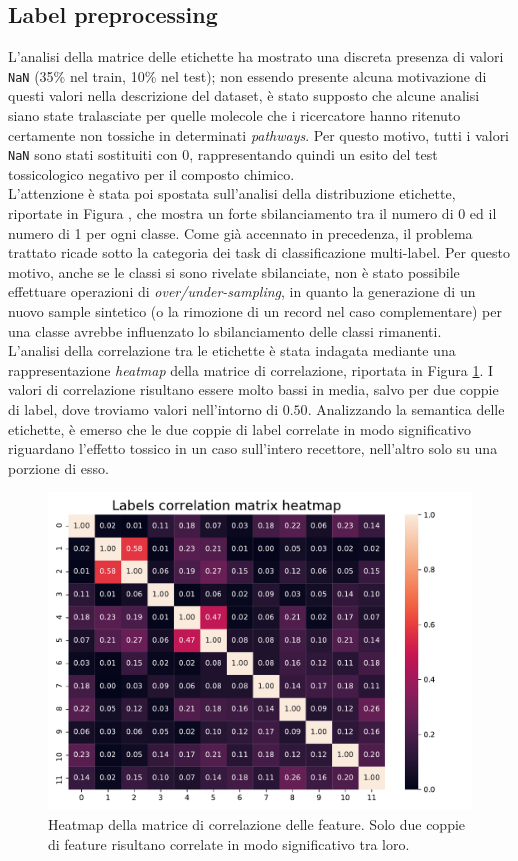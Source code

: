 \subsection{Label preprocessing}
L'analisi della matrice delle etichette ha mostrato una discreta presenza di valori \texttt{NaN} (35\% nel train, 10\% nel test); non essendo presente alcuna motivazione di questi valori nella descrizione del dataset, è stato supposto che alcune analisi siano state tralasciate per quelle molecole che i ricercatore hanno ritenuto certamente non tossiche in determinati \textit{pathways}. Per questo motivo, tutti i valori \texttt{NaN} sono stati sostituiti con $0$, rappresentando quindi un esito del test tossicologico negativo per il composto chimico. \\
L'attenzione è stata poi spostata sull'analisi della distribuzione etichette, riportate in Figura , che mostra un forte sbilanciamento tra il numero di 0 ed il numero di 1 per ogni classe. Come già accennato in precedenza, il problema trattato ricade sotto la categoria dei task di classificazione multi-label. Per questo motivo, anche se le classi si sono rivelate sbilanciate, non è stato possibile effettuare operazioni di \textit{over/under-sampling}, in quanto la generazione di un nuovo sample sintetico (o la rimozione di un record nel caso complementare) per una classe avrebbe influenzato lo sbilanciamento delle classi rimanenti. \\
L'analisi della correlazione tra le etichette è stata indagata mediante una rappresentazione \textit{heatmap} della matrice di correlazione, riportata in Figura \ref{fig:labelscorrmatrixheatmap}. I valori di correlazione risultano essere molto bassi in media, salvo per due coppie di label, dove troviamo valori nell'intorno di $0.50$. Analizzando la semantica delle etichette, è emerso che le due coppie di label correlate in modo significativo riguardano l'effetto tossico in un caso sull'intero recettore, nell'altro solo su una porzione di esso.
\begin{figure}
	\centering
	\includegraphics[width=0.7\linewidth]{../images/pdf/labels_corr_matrix_heatmap}
	\caption{Heatmap della matrice di correlazione delle feature. Solo due coppie di feature risultano correlate in modo significativo tra loro.}
	\label{fig:labelscorrmatrixheatmap}
\end{figure}

